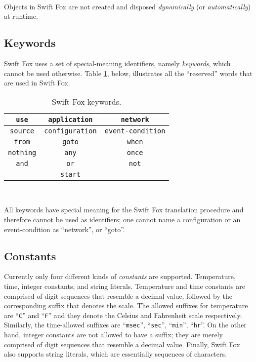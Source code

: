 \documentclass[11pt]{article}
\begin{document}
\

\hangindent=4cm
\small
\noindent
Objects in Swift Fox are not created and disposed \textit{dynamically} (or
\textit{automatically}) at runtime.
\normalsize

\subsection{Keywords}

Swift Fox uses a set of special-meaning identifiers, namely
\textit{keywords}, which cannot be used otherwise. Table
\ref{tbl:keywords}, below, illustrates all the ``reserved'' words that are 
used in Swift Fox.

\begin{table}[!h]
	\begin{center}
	\begin{tabular}{| c | c | c |}
	\hline
	\texttt{use} & \texttt{application} & \texttt{network}	\\
	\hline
	\texttt{source} & \texttt{configuration} & 
	\texttt{event-condition}					\\
	\hline
	\texttt{from} & \texttt{goto} & \texttt{when}			\\
	\hline
	\texttt{nothing} & \texttt{any} & \texttt{once}			\\
	\hline
	\texttt{and} & \texttt{or} & \texttt{not} 			\\
	\hline
	& \texttt{start} &	\\
	\hline
	\end{tabular}
	\end{center}
	\caption{Swift Fox keywords.}
	\label{tbl:keywords}
\end{table}

\

\hangindent=4cm
\small
\noindent
All keywords have special meaning for the Swift Fox translation procedure
and therefore cannot be used as identifiers; one cannot name a
configuration or an event-condition as ``network'', or ``goto''.
\normalsize

\subsection{Constants}

Currently only four different kinds of \textit{constants} are supported.
Temperature, time, integer constants, and string literals. Temperature and
time constants are comprised of digit sequences that resemble a decimal
value, followed by the corresponding suffix that denotes the scale. The
allowed suffixes for temperature are ``\texttt{C}'' and ``\texttt{F}'' and
they denote the Celsius and Fahrenheit scale respectively. Similarly, the
time-allowed suffixes are ``\texttt{msec}'', ``\texttt{sec}'',
``\texttt{min}'', ``\texttt{hr}''. On the other hand, integer constants are
not allowed to have a suffix; they are merely comprised of digit sequences
that resemble a decimal value. Finally, Swift Fox also supports string
literals, which are essentially sequences of characters.
\end{document}
